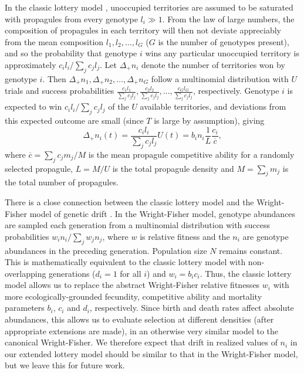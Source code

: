 \documentclass[11pt]{article}
\begin{document}
In the classic lottery model \citep{chesson_1981}, unoccupied territories are assumed to be saturated with propagules from every genotype $l_i\gg 1$. From the law of large numbers, the composition of propagules in each territory will then not deviate appreciably from the mean composition $l_1,l_2,\ldots,l_G$ ($G$ is the number of genotypes present), and so the probability that genotype $i$ wins any particular unoccupied territory is approximately $c_i l_i/\sum_j c_j l_j$. Let $\Delta_+ n_i$ denote the number of territories won by genotype $i$. Then $\Delta_+ n_1,\Delta_+ n_2,\ldots,\Delta_+ n_G$ follow a multinomial distribution with $U$ trials and success probabilities $\frac{c_1 l_1}{\sum_j c_j l_j},\frac{c_2 l_2}{\sum_j c_j l_j},\ldots,\frac{c_G l_G}{\sum_j c_j l_j}$, respectively. Genotype $i$ is expected to win $c_i l_i/\sum_j c_j l_j$ of the $U$ available territories, and deviations from this expected outcome are small (since $T$ is large by assumption), giving 
\begin{equation}
\Delta_+ n_i(t)=\frac{c_i l_i}{\sum_j c_j l_j}U(t)=b_i n_i\frac{1}{L}\frac{c_i}{\overline{c}}, \label{eq:lottery}
\end{equation}
where $\overline{c}=\sum_j c_j m_j/M$ is the mean propagule competitive ability for a randomly selected propagule, $L=M/U$ is the total propagule density and $M=\sum_j m_j$ is the total number of propagules. 

There is a close connection between the classic lottery model and the Wright-Fisher model of genetic drift \citep{svardal_2015}. In the Wright-Fisher model, genotype abundances are sampled each generation from a multinomial distribution with success probabilities $w_i n_i/\sum_j w_j n_j$, where $w$ is relative fitness and the $n_i$ are  genotype abundances in the preceding generation. Population size $N$ remains constant. This is mathematically equivalent to the classic lottery model with non-overlapping generations ($d_i=1$ for all $i$) and $w_i=b_i c_i$. Thus, the classic lottery model allows us to replace the abstract Wright-Fisher relative fitnesses $w_i$ with more ecologically-grounded fecundity, competitive ability and mortality parameters $b_i$, $c_i$ and $d_i$, respectively. Since birth and death rates affect absolute abundances, this allows us to evaluate selection at different densities (after appropriate extensions are made), in an otherwise very similar model to the canonical Wright-Fisher. We therefore expect that drift in realized values of $n_i$ in our extended lottery model should be similar to that in the Wright-Fisher model, but we leave this for future work. 
\end{document}
